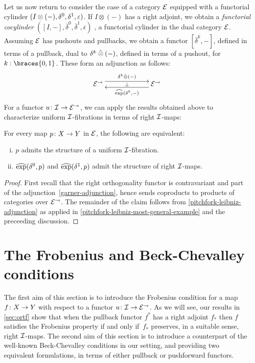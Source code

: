 \documentclass[reqno,10pt,a4paper,oneside,draft]{amsart}
\begin{document}
Let us now return to consider the case of  a category $\cal{E}$ equipped with a functorial cylinder $(\interval \otimes (-), \lcyl, \rcyl, \ccyl)$.
If $I \otimes (-)$ has a right adjoint, we obtain a \emph{functorial cocylinder} $([I, -], \overline{\delta}^0, \overline{\delta}^1, \overline{\epsilon})$ , \ie a functorial cylinder in the dual category $\catE$. 
Assuming $\catE$ has pushouts and pullbacks, we obtain a functor $[\overline{\delta}^k, -]$, defined in terms of a pullback, dual to $\kcyl \hatotimes (-)$, defined in terms of a pushout, for $k : \braces{0, 1}$.
These form an adjunction as follows:
\[
\xymatrix@C+4em{
  \cal{E}^\to \ar@<1ex>[r]^{\kcyl \hatotimes (-)} \ar@{}[r]|{\bot} &
  \cal{E}^\to \ar@<1ex>[l]^{\hatexp(\kcyl, -)}
}
\]
For a functor $u \co \cal{I} \to \cal{E}^\to$, we can apply the results obtained above to characterize uniform $\cal{I}$-fibrations in terms of right $\cal{I}$-maps:

\begin{proposition} \label{prod-exp-general}
For every map $p \co X \to Y$ in $\cal{E}$, the following are equivalent:
\begin{enumerate}[(i)]
\item $p$ admits the structure of a uniform $\cal{I}$-fibration.
\item $\hatexp(\lcyl, p)$ and $\hatexp(\rcyl, p)$ admit the structure of right $\cal{I}$-maps.
\end{enumerate}
\end{proposition}

\begin{proof}
First recall that the right orthogonality functor is contravariant and part of the adjunction~\eqref{garner-adjunction}, hence sends coproducts to products of categories over $\cal{E}^\to$.
The remainder of the claim follows from \cref{pitchfork-leibniz-adjunction} as applied in \cref{pitchfork-leibniz-most-general-example} and the preceeding discussion.
\end{proof}


\section{The Frobenius and Beck-Chevalley conditions}
\label{sec:frobc}

The first aim of this section is to introduce the Frobenius condition for a map $f \co X \to Y$ with respect to a functor $u \co \cal{I}
\to \cal{E}^\to$.
As we will see, our results in \cref{sec:ortf} show that when the pullback functor $f^*$ has a right adjoint $f_*$ then $f$ satisfies the Frobenius property if and only if~$f_*$ preserves, in a suitable sense, right $\cal{I}$-maps.
The second aim of this section is to introduce a counterpart of the well-known Beck-Chevalley conditions in our setting, and providing two equivalent formulations, in terms of either pullback or pushforward functors.
\end{document}

